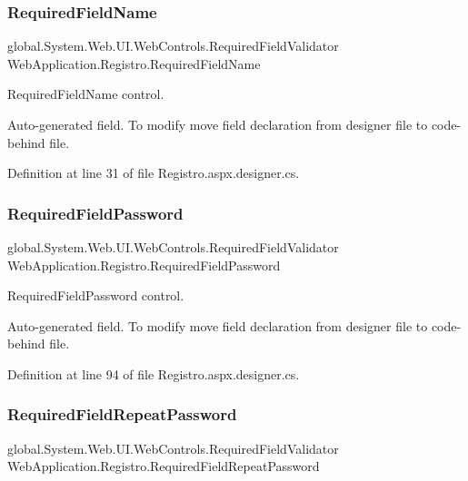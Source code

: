 \subsubsection{\texorpdfstring{RequiredFieldName}{RequiredFieldName}}
{\footnotesize\ttfamily global.\+System.\+Web.\+U\+I.\+Web\+Controls.\+Required\+Field\+Validator Web\+Application.\+Registro.\+Required\+Field\+Name\hspace{0.3cm}{\ttfamily [protected]}}



Required\+Field\+Name control. 

Auto-\/generated field. To modify move field declaration from designer file to code-\/behind file. 

Definition at line 31 of file Registro.\+aspx.\+designer.\+cs.

\mbox{\label{classWebApplication_1_1Registro_a73fc7b6c391087c89de40b8f91181b15}} 
\subsubsection{\texorpdfstring{RequiredFieldPassword}{RequiredFieldPassword}}
{\footnotesize\ttfamily global.\+System.\+Web.\+U\+I.\+Web\+Controls.\+Required\+Field\+Validator Web\+Application.\+Registro.\+Required\+Field\+Password\hspace{0.3cm}{\ttfamily [protected]}}



Required\+Field\+Password control. 

Auto-\/generated field. To modify move field declaration from designer file to code-\/behind file. 

Definition at line 94 of file Registro.\+aspx.\+designer.\+cs.

\mbox{\label{classWebApplication_1_1Registro_ad9609d7ca383d27791eea9f0b62ea57e}} 
\subsubsection{\texorpdfstring{RequiredFieldRepeatPassword}{RequiredFieldRepeatPassword}}
{\footnotesize\ttfamily global.\+System.\+Web.\+U\+I.\+Web\+Controls.\+Required\+Field\+Validator Web\+Application.\+Registro.\+Required\+Field\+Repeat\+Password\hspace{0.3cm}{\ttfamily [protected]}}



